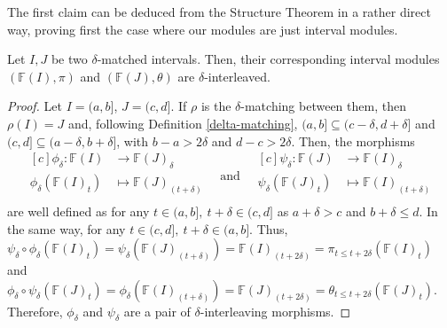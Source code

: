 The first claim can be deduced from the Structure Theorem in a rather direct way, proving first the case where our modules are just interval modules.

\begin{lemma} \cite[Exercise 2.2.7]{polterovich} \label{interval-interleaving-if-matching}
    Let $ I, J $ be two $\delta$-matched intervals. Then, their corresponding interval modules $ (\mathbb F (I), \pi) $ and $( \mathbb F (J), \theta) $ are $\delta$-interleaved.
\end{lemma}
\begin{proof}
    Let $ I = (a, b] $, $ J = (c, d] $. If $\rho$ is the $\delta$-matching between them, then $ \rho(I) = J $ and, following Definition \ref{delta-matching}, $ (a, b] \subseteq (c-\delta, d+\delta] $ and $ (c, d] \subseteq (a-\delta, b+\delta] $, with $ b - a > 2\delta $ and $ d - c > 2\delta $. Then, the morphisms
    \begin{equation*}
        \begin{aligned}[c]
        \phi_\delta\colon \mathbb F(I) &\to \mathbb F(J)_\delta\\
        \phi_\delta(\mathbb F(I)_t) &\mapsto \mathbb F(J)_{(t+\delta)}\\
        \end{aligned}
        \quad \text{and} \quad
        \begin{aligned}[c]
        \psi_\delta\colon \mathbb F(J) &\to \mathbb F(I)_\delta\\
        \psi_\delta(\mathbb F(J)_t) &\mapsto \mathbb F(I)_{(t+\delta)}\\
        \end{aligned}
    \end{equation*}
    are well defined as for any $ t \in (a,b], \ t + \delta \in (c, d] $ as $ a + \delta > c $ and $ b + \delta \leq d $. In the same way, for any $ t \in (c,d], \ t + \delta \in (a, b] $. Thus, $ \psi_\delta \circ \phi_\delta (\mathbb F(I)_t) = \psi_\delta(\mathbb F(J)_{(t+\delta)}) = \mathbb F(I)_{(t+2\delta)} = \pi_{t \leq t+2\delta}(\mathbb F(I)_t)$ and $ \phi_\delta \circ \psi_\delta (\mathbb F(J)_t) = \phi_\delta(\mathbb F(I)_{(t+\delta)}) = \mathbb F(J)_{(t+2\delta)} = \theta_{t \leq t+2\delta}(\mathbb F(J)_t)$. Therefore, $ \phi_\delta $ and $ \psi_\delta $ are a pair of $\delta$-interleaving morphisms.
\end{proof}

